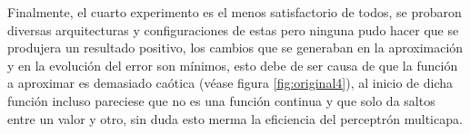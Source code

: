 Finalmente, el cuarto experimento es el menos satisfactorio de todos, se probaron diversas arquitecturas y configuraciones de estas pero ninguna pudo hacer que se produjera un resultado positivo, los cambios que se generaban en la aproximación y en la evolución del error son mínimos, esto debe de ser causa de que la función a aproximar es demasiado caótica (véase figura \ref{fig:original4}), al inicio de dicha función incluso pareciese que no es una función continua y que solo da saltos entre un valor y otro, sin duda esto merma la eficiencia del perceptrón multicapa.